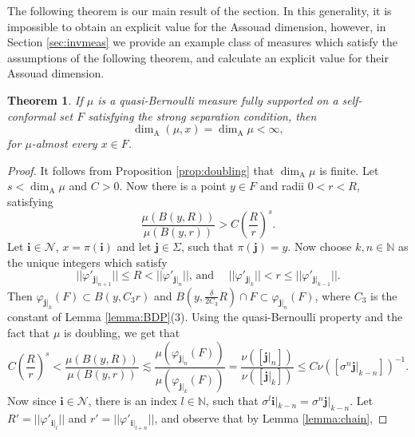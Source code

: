 \documentclass{PRM}
\newcommand{\field}[1]{\mathbb{#1}}
\newcommand{\N}{\field{N}}
\theoremstyle{plain}
\newtheorem{thm}{Theorem}[section]
\theoremstyle{definition}
\theoremstyle{remark}
\begin{document}
The following theorem is our main result of the section. In this generality, it is impossible to obtain an explicit value for the Assouad dimension, however, in Section \ref{sec:invmeas} we provide an example class of measures which satisfy the assumptions of the following theorem, and calculate an explicit value for their Assouad dimension.

\begin{thm}\label{thm:quasi-bernoulli-exact-assouad}
If $\mu$ is a quasi-Bernoulli measure fully supported on a self-conformal set $F$ satisfying the strong separation condition, then
\begin{equation*}
    \dim_{\mathrm{A}}(\mu,x)=\dim_{\mathrm{A}}\mu<\infty,
\end{equation*}
for $\mu$-almost every $x\in F$.
\end{thm}
\begin{proof}
It follows from Proposition \ref{prop:doubling} that $\dim_{\mathrm{A}}\mu$ is finite. Let $s<\dim_{\mathrm{A}}\mu$ and $C>0$.
Now there is a point $y\in F$ and radii $0<r<R$, satisfying
\begin{equation*}
    \frac{\mu(B(y,R))}{\mu(B(y,r))}> C\left(\frac{R}{r}\right)^s.
\end{equation*}
Let $\mathbf{i}\in \mathcal{N}$, $x=\pi(\mathbf{i})$ and let $\mathbf{j}\in\Sigma$, such that $\pi(\mathbf{j})=y$.  Now choose $k,n\in\N$ as the unique integers which satisfy
\begin{equation*}
    ||\varphi'_{\mathbf{j}|_{n+1}}||\leq R < ||\varphi'_{\mathbf{j}|_{n}}|| \text{, and }\quad ||\varphi'_{\mathbf{j}|_{k}}||< r \leq ||\varphi'_{\mathbf{j}|_{k-1}}||.
\end{equation*} Then $\varphi_{\mathbf{j}|_k}(F)\subset B(y,C_3r)$ and $B(y,\frac{\delta}{2C_3}R)\cap F\subset \varphi_{\mathbf{j}|_n}(F)$, where $C_3$ is the constant of Lemma \ref{lemma:BDP}(3). Using the quasi-Bernoulli property and the fact that $\mu$ is doubling, we get that
\begin{equation*}
    C\left(\frac{R}{r}\right)^s<\frac{\mu(B(y,R))}{\mu(B(y,r))}\lesssim \frac{\mu(\varphi_{\mathbf{j}|_n}(F))}{\mu(\varphi_{\mathbf{j}|_k}(F))}=\frac{\nu([\mathbf{j}|_n])}{\nu([\mathbf{j}|_k])}\leq C\nu([\sigma^{n}\mathbf{j}|_{k-n}])^{-1}.
\end{equation*}
Now since $\mathbf{i}\in \mathcal{N}$, there is an index $l\in\N$, such that $\sigma^l\mathbf{i}|_{k-n}=\sigma^{n}\mathbf{j}|_{k-n}$. Let $R'=||\varphi'_{\mathbf{i}|_{l}}||$ and $r'= ||\varphi'_{\mathbf{i}|_{l+n}}||$, and observe that by Lemma \ref{lemma:chain},

\end{proof}
\end{document}
